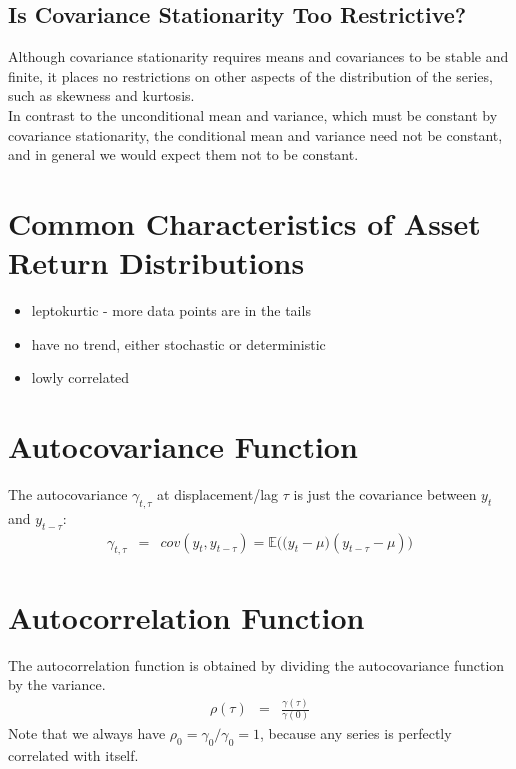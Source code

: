 \subsection{Is Covariance Stationarity Too Restrictive?}
Although covariance stationarity requires means and covariances to be stable and finite, it places no restrictions on other aspects of the distribution of the series, such as skewness and kurtosis.\\
In contrast to the unconditional mean and variance, which must be constant by covariance stationarity, the conditional mean and variance need not be constant, and in general we would expect them not to be constant.

\section{Common Characteristics of Asset Return Distributions}
\begin{itemize}
	\item leptokurtic - more data points are in the tails
	\item have no trend, either stochastic or deterministic
	\item lowly correlated
\end{itemize}

\section{Autocovariance Function}
The autocovariance $\gamma_{t, \tau}$ at displacement/lag $\tau$ is just the covariance between $y_{t}$ and $y_{t - \tau}$:
\begin{eqnarray}
	\gamma_{t, \tau} &=& cov(y_{t}, y_{t - \tau}) = \mathbb{E}\Big(\big(y_{t} - \mu\big)(y_{t - \tau} - \mu)\Big)
\end{eqnarray}

\section{Autocorrelation Function}
The autocorrelation function is obtained by dividing the autocovariance function by the variance.
\begin{eqnarray}
	\rho(\tau) &=& \frac{\gamma(\tau)}{\gamma(0)}
\end{eqnarray}
Note that we always have $\rho_{0} = \gamma_{0} / \gamma_{0} = 1$, because any series is perfectly correlated with itself.

